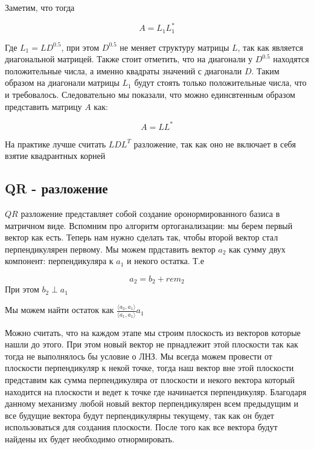 \documentclass{article}
\begin{document}
    Заметим, что тогда

    \begin{equation}
        A = L_{1} L_{1}^{*}
    \end{equation}

    Где $L_{1} = L D^{0.5}$, при этом $D^{0.5}$ не меняет структуру матрицы $L$, так как является диагональной матрицей. 
    Также стоит отметить, что на диагонали у $D^{0.5}$ находятся положительные числа, а именно квадраты значений с диагонали $D$. 
    Таким образом на диагонали матрицы $L_{1}$ будут стоять только положительные числа, что и требовалось.
    Следовательно мы показали, что можно единсвтенным образом представить матрицу $A$ как: 

    \begin{equation}
        A = L L^{*}
    \end{equation}

    На практике лучше считать $LDL^{T}$ разложение, так как оно не включает в себя взятие 
    квадрантных корней

    \subsection{QR - разложение}

    $QR$ разложение представляет собой создание оронормированного базиса в матричном виде.
    Вспомним про алгоритм ортоганализации: мы берем первый вектор как есть. 
    Теперь нам нужно сделать так, чтобы второй вектор стал перпендикулярен первому.
    Мы можем прдставить вектор $a_{2}$ как сумму двух компонент: перпендикуляра к $a_{1}$ и 
    некого остатка. Т.е 

    \begin{equation}
        a_{2} = b_{2} + rem_{2}
    \end{equation}
    При этом $b_{2} \perp a_{1}$
    
    \quad

    Мы можем найти остаток как $\frac{\langle a_{2}, a_{1} \rangle}{\langle a_{1}, a_{1} \rangle} a_{1}$

    \quad 

    Можно считать, что на каждом этапе мы строим плоскость из векторов которые нашли до этого. 
    При этом новый вектор не прнадлежит этой плоскости так как 
    тогда не выполнялось бы условие о ЛНЗ. Мы всегда можем провести от плоскости перпендикуляр к некой точке, тогда наш вектор вне этой плоскости 
    представим как сумма перпендикуляра от плоскости и некого вектора который находится на плоскости и ведет к точке где начинается перпендикуляр.
    Благодаря данному механизму любой новый вектор перпендикулярен всем предыдущим и все будущие вектора будут
    перпендикулярны текущему, так как он будет использоваться для создания плоскости. После того как все вектора будут найдены 
    их будет необходимо отнормировать.
    
\end{document}
